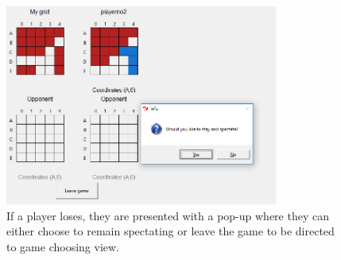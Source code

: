 \documentclass[]{article}
\begin{document}
\begin{figure}[!hbt]
	\centering
	\includegraphics[width=0.8\textwidth]{LoserChoose.png}
	\caption{If a player loses, they are presented with a pop-up where they can either choose to remain spectating or leave the game to be directed to game choosing view.}
	\label{fig:LoserChoose}
\end{figure}
\end{document}
